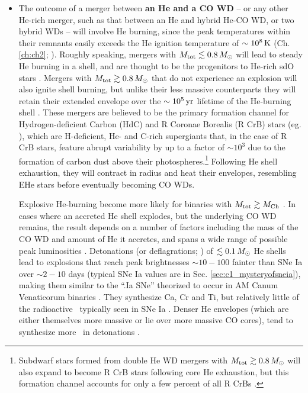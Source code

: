 \begin{itemize}
	\item The outcome of a merger between {\bf an He and a CO WD} -- {\charles or any other He-rich merger, such as that between an He and hybrid He-CO WD, or two hybrid WDs -- will involve He burning, since the peak temperatures within their remnants easily exceeds the He ignition temperature of $\sim10^8\,\mathrm{K}$ (Ch. \ref{ch:ch2}; \citealt{dan+14}).}  Roughly speaking, mergers with $\Mtot \lesssim 0.8\,\Msun$ will lead to steady He burning in a shell, and are thought to be the progenitors to He-rich sdO stars \citep{justph11}.  Mergers with $\Mtot \gtrsim 0.8\,\Msun$ that do not experience an explosion will also ignite shell burning, but unlike their less massive counterparts they will retain their extended envelope {\charles over the $\sim10^5\,\mathrm{yr}$ lifetime} of the He-burning shell \citep{ibent85, zhanj12b}.  These mergers are believed to be the primary formation channel for Hydrogen-deficient Carbon (HdC) and R Coronae Borealis (R CrB) stars (eg. \citealt{webb84, ibent84, saioj02, clay12, zhan+14}), which are H-deficient, He- and C-rich supergiants that, in the case of R CrB stars, feature abrupt variability by up to a factor of $\sim10^3$ due to the formation of carbon dust above their photospheres.\footnote{Subdwarf stars formed from double He WD mergers with $\Mtot \gtrsim 0.8\,\Msun$ will also expand to become R CrB stars following core He exhaustion, but this formation channel accounts for only a few percent of all R CrBs \citep{zhanj12b}.}  Following He shell exhaustion, they will contract in radius and heat their envelopes, resembling EHe stars \citep{saioj02, jeff14} before eventually becoming CO WDs.

Explosive He-burning become more likely for binaries with $\Mtot\gtrsim\Mch$ \citep{dan+12, dan+14}.  In cases where an accreted He shell explodes, but the underlying CO WD remains, the result depends on a number of factors including the mass of the CO WD and amount of He it accretes, and spans a wide range of possible peak luminosities \citep{shen+10he, wald+11, woosk11}.  Detonations (or deflagrations; \citealt{woosk11}) of $\lesssim0.1\,\Msun$ He shells lead to explosions that reach peak brightnesses $\sim10-100$ fainter than SNe Ia over $\sim2-10$ days (typical SNe Ia values are in Sec. \ref{sec:c1_mysteryofsneia}), making them similar to the ``.Ia SNe'' theorized to occur in AM Canum Venaticorum binaries \citep{bild+07}.  They synthesize Ca, Cr and Ti, but relatively little of the radioactive \Ni\ typically seen in SNe Ia \citep{shen+10he, woosk11, wald+11}.  Denser He envelopes (which are either themselves more massive or lie over more massive CO cores), tend to synthesize more \Ni\ in detonations \citep{shen+10he, wald+11}. 


\end{itemize}
